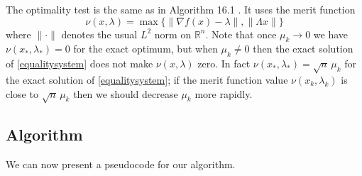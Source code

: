 \documentclass[11pt]{article}
\newcommand{\RR}{\mathbb{R}}
\newcommand{\grad}{\nabla}
\begin{document}
The optimality test is the same as in Algorithm 16.1 \cite{GrivaNashSofer2009}.  It uses the merit function
    $$\nu(x,\lambda) = \max\{\|\grad f(x)-\lambda\|,\|\Lambda x\|\}$$
where $\|\cdot\|$ denotes the usual $L^2$ norm on $\RR^n$.  Note that once $\mu_k\to 0$ we have $\nu(x_*,\lambda_*) = 0$ for the exact optimum, but when $\mu_k \ne 0$ then the exact solution of \eqref{equalitysystem} does not make $\nu(x,\lambda)$ zero.  In fact $\nu(x_*,\lambda_*) = \sqrt{n}\, \mu_k$ for the exact solution of \eqref{equalitysystem}; if the merit function value $\nu(x_k,\lambda_k)$ is close to $\sqrt{n}\, \mu_k$ then we should decrease $\mu_k$ more rapidly.


\subsection*{Algorithm}

We can now present a pseudocode for our algorithm.
\end{document}
